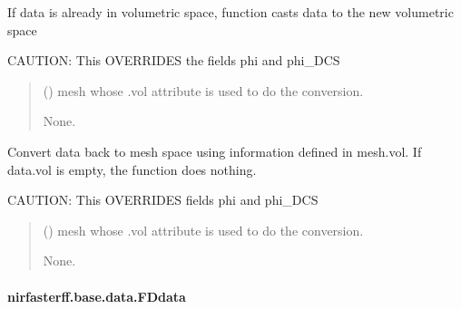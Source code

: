 \documentclass[letterpaper,10pt,english]{sphinxmanual}
\begin{document}
\begin{fulllineitems}
\begin{fulllineitems}
\sphinxAtStartPar
If data is already in volumetric space, function casts data to the new volumetric space

\sphinxAtStartPar
CAUTION: This OVERRIDES the fields phi and phi\_DCS
\begin{quote}\begin{description}
\sphinxAtStartPar
{} () \textendash{} mesh whose .vol attribute is used to do the conversion.

\sphinxAtStartPar
None.

\end{description}\end{quote}

\end{fulllineitems}


\begin{fulllineitems}
\label{\detokenize{_autosummary/nirfasterff.base.data.DCSdata:nirfasterff.base.data.DCSdata.tomesh}}
\pysigstartsignatures
{}
\pysigstopsignatures
\sphinxAtStartPar
Convert data back to mesh space using information defined in mesh.vol. If data.vol is empty, the function does nothing.

\sphinxAtStartPar
CAUTION: This OVERRIDES fields phi and phi\_DCS
\begin{quote}\begin{description}
\sphinxAtStartPar
{} () \textendash{} mesh whose .vol attribute is used to do the conversion.

\sphinxAtStartPar
None.

\end{description}\end{quote}

\end{fulllineitems}


\end{fulllineitems}


\sphinxstepscope


\paragraph{nirfasterff.base.data.FDdata}
\label{\detokenize{_autosummary/nirfasterff.base.data.FDdata:nirfasterff-base-data-fddata}}\label{\detokenize{_autosummary/nirfasterff.base.data.FDdata::doc}}
\end{document}
